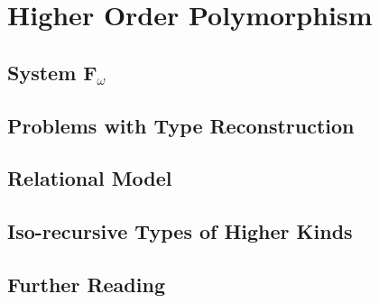 \chapter{Higher Order Polymorphism}

\section{System F$_\omega$}

\section{Problems with Type Reconstruction}

\section{Relational Model}

\section{Iso-recursive Types of Higher Kinds}

\section{Further Reading}
